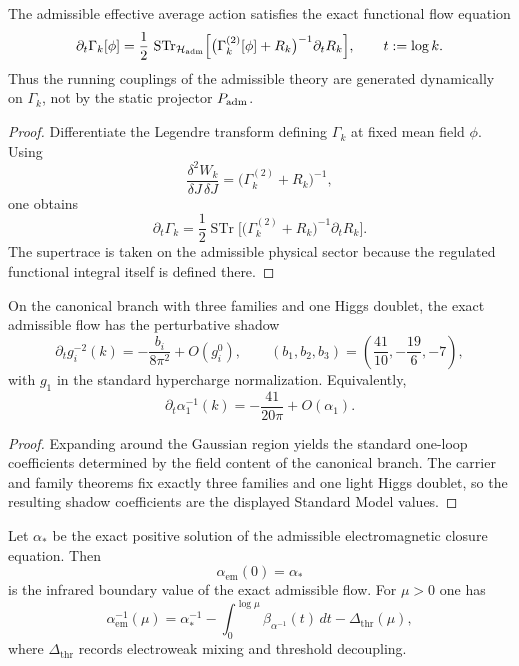 \begin{theorem}
\label{thm:exact-admissible-rg-flow}
The admissible effective average action satisfies the exact functional flow equation
\[
\partial_t \Gamma_k[\phi]
=
\frac12\,
\operatorname{STr}_{\mathcal H_{\mathrm{adm}}}
\Bigl[
\bigl(\Gamma_k^{(2)}[\phi]+R_k\bigr)^{-1}
\partial_t R_k
\Bigr],
\qquad
t:=\log k.
\]
Thus the running couplings of the admissible theory are generated dynamically on $\Gamma_k$, not by
the static projector $P_{\mathrm{adm}}$.
\end{theorem}

\begin{proof}
Differentiate the Legendre transform defining $\Gamma_k$ at fixed mean field $\phi$. Using
\[
\frac{\delta^2 W_k}{\delta J\,\delta J}
=
\bigl(\Gamma_k^{(2)}+R_k\bigr)^{-1},
\]
one obtains
\[
\partial_t \Gamma_k
=
\frac12 \operatorname{STr}
\bigl[
\bigl(\Gamma_k^{(2)}+R_k\bigr)^{-1}\partial_t R_k
\bigr].
\]
The supertrace is taken on the admissible physical sector because the regulated functional integral
itself is defined there.
\end{proof}

\begin{corollary}
\label{cor:one-loop-shadow-exact-flow}
On the canonical branch with three families and one Higgs doublet, the exact admissible flow has
the perturbative shadow
\[
\partial_t g_i^{-2}(k)=-\frac{b_i}{8\pi^2}+O(g_i^0),
\qquad
(b_1,b_2,b_3)=\left(\frac{41}{10},-\frac{19}{6},-7\right),
\]
with $g_1$ in the standard hypercharge normalization. Equivalently,
\[
\partial_t \alpha_1^{-1}(k)=-\frac{41}{20\pi}+O(\alpha_1).
\]
\end{corollary}

\begin{proof}
Expanding  around the Gaussian region yields the standard
one-loop coefficients determined by the field content of the canonical branch. The carrier and
family theorems fix exactly three families and one light Higgs doublet, so the resulting shadow
coefficients are the displayed Standard Model values.
\end{proof}

\begin{corollary}
\label{cor:em-ir-boundary-condition}
Let $\alpha_\ast$ be the exact positive solution of the admissible electromagnetic closure equation.
Then
\[
\alpha_{\mathrm{em}}(0)=\alpha_\ast
\]
is the infrared boundary value of the exact admissible flow. For $\mu>0$ one has
\[
\alpha_{\mathrm{em}}^{-1}(\mu)
=
\alpha_\ast^{-1}
-\int_0^{\log\mu}\beta_{\alpha^{-1}}(t)\,dt
-\Delta_{\mathrm{thr}}(\mu),
\]
where $\Delta_{\mathrm{thr}}$ records electroweak mixing and threshold decoupling.
\end{corollary}

